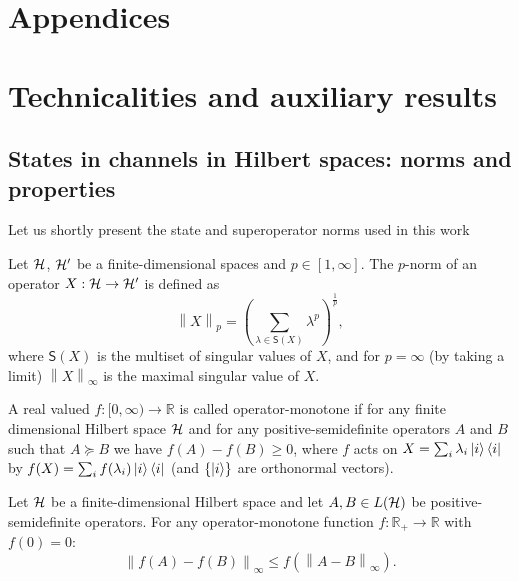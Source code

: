 \documentclass[10pt]{article}
\newcommand{\R}{\mathbb{R}}
\newcommand{\p}[1]{\left(#1\right)}
\newcommand{\ppp}[1]{\left\{#1\right\}}
\newcommand{\norm}[1]{\left\|#1\right\|}
\newcommand{\s}[1]{\mathsf{#1}}
\begin{document}
\appendix
\makeatletter
\section*{Appendices}


 
 \section{Technicalities and auxiliary results}
 \subsection{States in channels in Hilbert spaces: norms and properties}
 Let us shortly present the state and superoperator norms used in this work
 \begin{definition}\label{Def:StateNorms}
Let ${\cal H}$, ${\cal H}'$ be a finite-dimensional spaces and $p\in  [1,\infty]$. The $p$-norm of an operator $X:{\cal H}\to {\cal H}'$ is defined as 
\[\norm{X}_p=\p{\sum_{\lambda \in \s{S}(X)}\lambda^p}^{\frac{1}{p}
},\]
where $\s{S}(X)$ is the multiset of singular values of $X$, and for $p=\infty$ (by taking a limit) $\norm{X}_{\infty}$ is the maximal singular value of $X$.
\end{definition} 
\begin{definition}\label{eq:operatorMonotone}
    A real valued $f:[0,\infty)\to \R$ is called operator-monotone if for any finite dimensional Hilbert space ${\cal H}$  and for any positive-semidefinite operators  $A $ and  $B$ such that $A\succeq B$ we have $f(A)-f(B)\geq 0$, where $f$ acts on $X=\sum_{i}\lambda_i\ket{i}\bra{i}$ by $f(X)=\sum_i f(\lambda_i) \ket{i}\bra{i}$ 
    (and $\ppp{\ket{i}}$ are orthonormal vectors).
\end{definition}
\begin{lemma}\label{lem:HolderTypef} \cite[Theorem X.1.1]{bhatia2013matrix}
Let ${\cal H}$ be  a finite-dimensional Hilbert space and let $A,B\in L({\cal H})$ be positive-semidefinite operators. For any  operator-monotone function  $f:\R_+\to \R$ with $f(0)=0$: 
\[ \norm{f(A)-f(B)}_{\infty}\leq f(\norm{A-B}_{\infty}).\]
\end{lemma}
\end{document}
